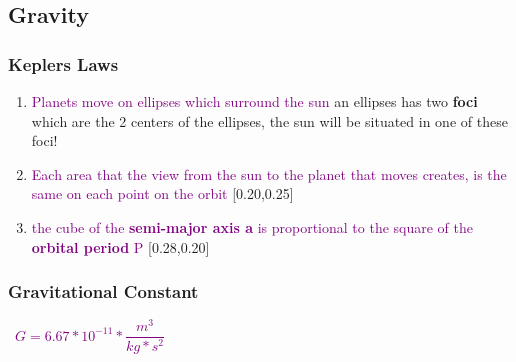 \documentclass[main.tex,fontsize=8pt,paper=a4,paper=portrait,DIV=calc,]{scrartcl}
\begin{document}
\begin{multicols*}{2}
\subsection{Gravity}
\subsubsection{Keplers Laws}
\begin{enumerate}
\item \textcolor{purple}{Planets move on ellipses which surround the sun}\newline
  an ellipses has two \textbf{foci} which are the 2 centers of the ellipses, the sun will be situated in one of these foci!
\item \textcolor{purple}{Each area that the view from the sun to the planet that moves creates, is the same on each point on the orbit}\newline
  [0.20,0.25]
\item \textcolor{purple}{the cube of the \textbf{semi-major axis a} is proportional to the square of the \textbf{orbital period} P}\newline
  [0.28,0.20]
\end{enumerate} 

\subsubsection{Gravitational Constant}
\, \newline
\large \textcolor{purple}{\( G = 6.67 * 10^{-11}*\dfrac{m^3}{kg * s^2} \)}\newline
\, \newline
\normalsize 



\end{multicols*}
\end{document}
